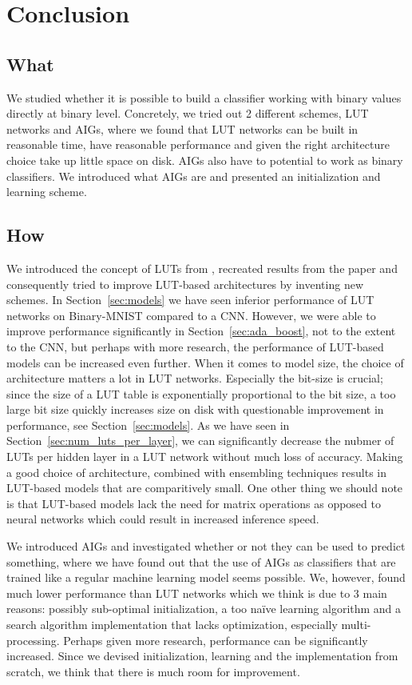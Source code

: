 \section{Conclusion}

\subsection{What}
We studied whether it is possible to build a classifier working with binary values directly at binary level. Concretely, we tried out 2 different schemes, LUT networks and AIGs, where we found that LUT networks can be built in reasonable time, have reasonable performance and given the right architecture choice take up little space on disk. AIGs also have to potential to work as binary classifiers. We introduced what AIGs are and presented an initialization and learning scheme.

\subsection{How}
We introduced the concept of LUTs from \cite{bib:chatterjee2018learning}, recreated results from the paper and consequently tried to improve LUT-based architectures by inventing new schemes. In Section~\ref{sec:models} we have seen inferior performance of LUT networks on Binary-MNIST compared to a CNN. However, we were able to improve performance significantly in Section~\ref{sec:ada_boost}, not to the extent to the CNN, but perhaps with more research, the performance of LUT-based models can be increased even further. When it comes to model size, the choice of architecture matters a lot in LUT networks. Especially the bit-size is crucial; since the size of a LUT table is exponentially proportional to the bit size, a too large bit size quickly increases size on disk with questionable improvement in performance, see Section~\ref{sec:models}. As we have seen in Section~\ref{sec:num_luts_per_layer}, we can significantly decrease the nubmer of LUTs per hidden layer in a LUT network without much loss of accuracy. Making a good choice of architecture, combined with ensembling techniques results in LUT-based models that are comparitively small. One other thing we should note is that LUT-based models lack the need for matrix operations as opposed to neural networks which could result in increased inference speed.

We introduced AIGs and investigated whether or not they can be used to predict something, where we have found out that the use of AIGs as classifiers that are trained like a regular machine learning model seems possible. We, however, found much lower performance than LUT networks which we think is due to 3 main reasons: possibly sub-optimal initialization, a too naïve learning algorithm and a search algorithm implementation that lacks optimization, especially multi-processing. Perhaps given more research, performance can be significantly increased. Since we devised initialization, learning and the implementation from scratch, we think that there is much room for improvement.

